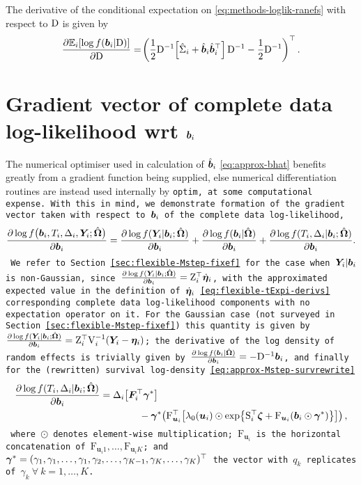The derivative of the conditional expectation on \eqref{eq:methods-loglik-ranefs} with respect to $\mathrm{D}$ is given by
\begin{align}
    \frac{\partial\mathbb{E}_i\!\left[\log f\!\left(\bm{b}_i|\mathrm{D}\right)\right]}{\partial\mathrm{D}} = \!\left(
    \frac{1}{2}\mathrm{D}^{-1}\!\left[\hat{\Sigma}_i+\hat{\bm{b}}_i\hat{\bm{b}}_i^\top\right]\mathrm{D}^{-1}-
    \frac{1}{2}\mathrm{D}^{-1}
    \right)^\top.
\end{align}

\section{Gradient vector of complete data log-likelihood wrt \texorpdfstring{$\bm{b}_i$}{b}}\label{sec:appendix-gradb}
The numerical optimiser used in calculation of $\hat{\bm{b}}_i$ \eqref{eq:approx-bhat} benefits greatly from a gradient function being supplied, else numerical differentiation routines are instead used internally by \tt{optim}, at some computational expense. With this in mind, we demonstrate formation of the gradient vector taken with respect to $\bm{b}_i$ of the complete data log-likelihood,
\begin{equation}
    \frac{\partial\log f\big(\bm{b}_i,T_i,\Delta_i,\bm{Y}_i;\hat{\bm{\Omega}}\big)}{\partial\bm{b}_i}=\frac{\partial\log f(\bm{Y}_i|\bm{b}_i;\hat{\bm{\Omega}})}{\partial\bm{b}_i}+\frac{\partial\log f(\bm{b}_i|\hat{\bm{\Omega}})}{\partial\bm{b}_i} + \frac{\partial\log f(T_i, \Delta_i|\bm{b}_i;\hat{\bm{\Omega}})}{\partial\bm{b}_i}.
\label{eq:appendix-logcompdatadb}
\end{equation}
We refer to Section \ref{sec:flexible-Mstep-fixef} for the case when $\bm{Y}_i|\bm{b}_i$ is non-Gaussian, since $\frac{\partial\log f(\bm{Y}_i|\bm{b}_i;\hat{\bm{\Omega}})}{\partial\bm{b}_i}=\mathrm{Z}_i^\top\dot{\bm{\eta}}_i$, with the approximated expected value in the definition of $\dot{\bm{\eta}}_i$ \eqref{eq:flexible-tExpi-derivs} corresponding complete data log-likelihood components with no expectation operator on it. For the Gaussian case (not surveyed in Section \ref{sec:flexible-Mstep-fixef}) this quantity is given by $\frac{\partial\log f(\bm{Y}_i|\bm{b}_i;\hat{\bm{\Omega}})}{\partial\bm{b}_i}=\mathrm{Z}_i^\top\mathrm{V}_i^{-1}\!\left(\bm{Y}_i-\bm{\eta}_i\right)$; the derivative of the log density of random effects is trivially given by $\frac{\partial\log f(\bm{b}_i|\hat{\bm{\Omega}})}{\partial\bm{b}_i}=-\mathrm{D}^{-1}\bm{b}_i$, and finally for the (rewritten) survival log-density \eqref{eq:approx-Mstep-survrewrite}
\begin{equation}
    \begin{aligned}
        \frac{\partial\log f(T_i, \Delta_i|\bm{b}_i;\hat{\bm{\Omega}})}{\partial\bm{b}_i}&=\Delta_i\!\left[\bm{F}_i^\top\bm{\gamma}^*\right]\\&\qquad\quad\quad-\bm{\gamma}^*\!\left(\mathrm{F}_{\bm{u}_i}^\top\!\left[\lambda_0\!\left(\bm{u}_i\right)\odot
        \exp\!\left\{\mathrm{S}_i^\top\bm{\zeta}+\mathrm{F}_{\bm{u}_i}\!\left(\bm{b}_i\odot\bm{\gamma}^*\right)\right\}\right]\right),
    \end{aligned}
\label{eq:appendix-gradb-surv}
\end{equation}
where $\odot$ denotes element-wise multiplication; $\mathrm{F}_{\bm{u}_i}$ is the horizontal concatenation of $\mathrm{F}_{\bm{u}_i1},\dots,\mathrm{F}_{\bm{u}_iK}$; and $\bm{\gamma}^*=(\gamma_1, \gamma_1,\dots,\gamma_1,\gamma_2,\dots,\gamma_{K-1},\gamma_K,\dots,\gamma_K)^\top$ \ie the vector with $q_k$ replicates of $\gamma_k\ \forall\ k=1,\dots,K$. 

